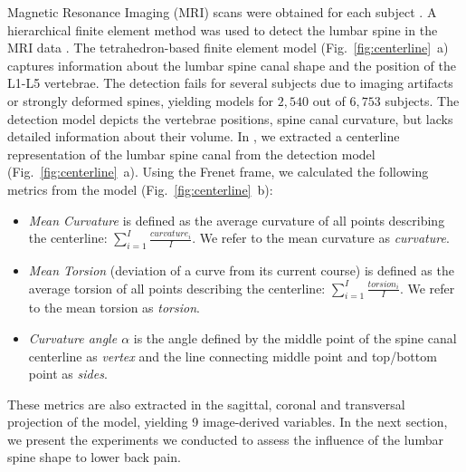\documentclass[a4paper,twoside]{style/article}
\begin{document}
Magnetic Resonance Imaging (MRI) scans were obtained for each subject \cite{Hegenscheid2013}.
A hierarchical finite element method was used to detect the lumbar spine in the MRI data \cite{Rak2013}.
The tetrahedron-based finite element model (Fig.~\ref{fig:centerline}~a) captures information about the lumbar spine canal shape and the position of the L1-L5 vertebrae.
The detection fails for several subjects due to imaging artifacts or strongly deformed spines, yielding models for $2,540$ out of $6,753$ subjects.
The detection model depicts the vertebrae positions, spine canal curvature, but lacks detailed information about their volume.
In \cite{Klemm2013VMV}, we extracted a centerline representation of the lumbar spine canal from the detection model (Fig.~\ref{fig:centerline}~a).
Using the Frenet frame, we calculated the following metrics from the model (Fig.~\ref{fig:centerline}~b): %
\begin{itemize}
	\item \emph{Mean Curvature} is defined as the average curvature of all points describing the centerline: $\sum_{i=1}^I \frac{\textit{curvature}_i}{I}$. We refer to the mean curvature as \emph{curvature}.
	\item \emph{Mean Torsion} (deviation of a curve from its current course) is defined as the average torsion of all points describing the centerline: $\sum_{i=1}^I \frac{\textit{torsion}_i}{I}$. We refer to the mean torsion as \emph{torsion}.
	\item \emph{Curvature angle $\alpha$} is the angle defined by the middle point of the spine canal centerline as \emph{vertex} and the line connecting middle point and top/bottom point as \emph{sides}.
\end{itemize}
These metrics are also extracted in the sagittal, coronal and transversal projection of the model, yielding 9 image-derived variables.
In the next section, we present the experiments we conducted to assess the influence of the lumbar spine shape to lower back pain.
\end{document}
